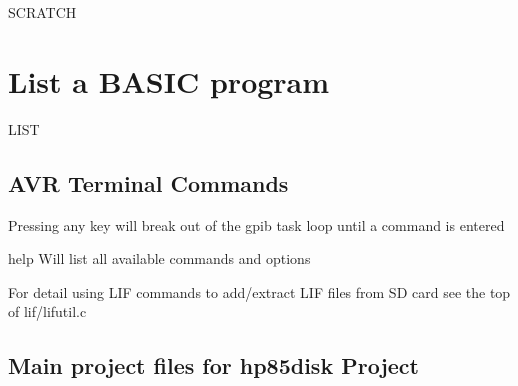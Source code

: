 \begin{DoxyPre}
  SCRATCH
\section*{List a BASIC program}\end{DoxyPre}



\begin{DoxyPre}
  LIST
\end{DoxyPre}
 



\subsection*{A\+VR Terminal Commands}


\begin{DoxyItemize}
\item Pressing any key will break out of the gpib task loop until a command is entered
\begin{DoxyItemize}
\item help Will list all available commands and options
\item For detail using L\+IF commands to add/extract L\+IF files from SD card see the top of lif/lifutil.\+c 


\end{DoxyItemize}
\end{DoxyItemize}

\subsection*{Main project files for hp85disk Project}



